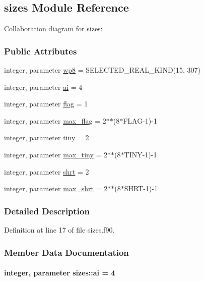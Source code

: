\hypertarget{classsizes}{\subsection{sizes Module Reference}
\label{classsizes}
}


Collaboration diagram for sizes\-:
\subsubsection*{Public Attributes}
\begin{DoxyCompactItemize}
\item 
integer, parameter \hyperlink{classsizes_a7f10d92edcfab4b18d1be16a1e4bde39}{wp8} = S\-E\-L\-E\-C\-T\-E\-D\-\_\-\-R\-E\-A\-L\-\_\-\-K\-I\-N\-D(15, 307)
\item 
integer, parameter \hyperlink{classsizes_a2601ff93b3984ececcfd48aae78fb6a6}{ai} = 4
\item 
integer, parameter \hyperlink{classsizes_a424174c724585fa743040b8cc6c0d22a}{flag} = 1
\item 
integer, parameter \hyperlink{classsizes_af1d01281c6760fff5e424262eb603d74}{max\-\_\-flag} = 2$\ast$$\ast$(8$\ast$F\-L\-A\-G-\/1)-\/1
\item 
integer, parameter \hyperlink{classsizes_ac491b592402fe8da6f0c09245628f761}{tiny} = 2
\item 
integer, parameter \hyperlink{classsizes_a04d73151c62e83015b458f2ae0646964}{max\-\_\-tiny} = 2$\ast$$\ast$(8$\ast$T\-I\-N\-Y-\/1)-\/1
\item 
integer, parameter \hyperlink{classsizes_a9fe4a96f9e9e8b6ff57d48364a829454}{shrt} = 2
\item 
integer, parameter \hyperlink{classsizes_af8f94289a78904a42ae6075afc3943ca}{max\-\_\-shrt} = 2$\ast$$\ast$(8$\ast$S\-H\-R\-T-\/1)-\/1
\end{DoxyCompactItemize}


\subsubsection{Detailed Description}


Definition at line 17 of file sizes.\-f90.



\subsubsection{Member Data Documentation}
\hypertarget{classsizes_a2601ff93b3984ececcfd48aae78fb6a6}{
\paragraph[{ai}]{\setlength{\rightskip}{0pt plus 5cm}integer, parameter sizes\-::ai = 4}}\label{classsizes_a2601ff93b3984ececcfd48aae78fb6a6}


